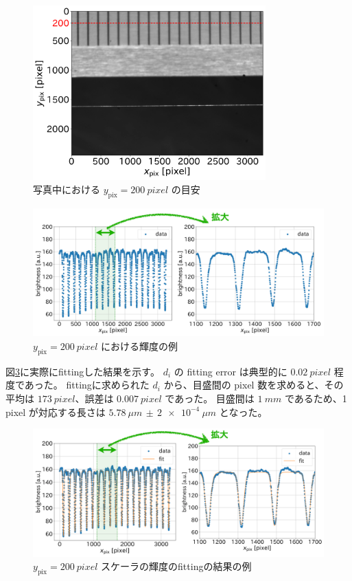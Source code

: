 \documentclass[../../main.tex]{subfiles}
\begin{document}
\begin{figure}[H]
    \centering
    \includegraphics[width=0.8\textwidth]{wiresag/wiresag_scaler_target.pdf}
    \caption{写真中における $y_{\mathrm{pix}}=\SI{200}{pixel}$ の目安}
    \label{fig:wiresag_scaler_target}
\end{figure}
\begin{figure}[H]
    \centering
    \includegraphics[width=1.0\textwidth]{wiresag/wiresag_scaler_brightness.pdf}
    \caption{$y_{\mathrm{pix}}=\SI{200}{pixel}$ における輝度の例}
    \label{fig:wiresag_scaler_brightness}
\end{figure}

図\ref{fig:wiresag_scaler_fitting}に実際にfittingした結果を示す。
$d_i$ の fitting error は典型的に $\SI{0.02}{pixel}$ 程度であった。
fittingに求められた $d_i$ から、目盛間の pixel 数を求めると、その平均は $\SI{173}{pixel}$、誤差は $\SI{0.007}{pixel}$ であった。
目盛間は $\SI{1}{mm}$ であるため、1 pixel が対応する長さは $\SI{5.78}{\mu m}\,\pm\,\SI{2e-4}{\mu m}$ となった。
\begin{figure}[H]
    \centering
    \includegraphics[width=1.0\textwidth]{wiresag/wiresag_scaler_fitting.pdf}
    \caption{$y_{\mathrm{pix}}=\SI{200}{pixel}$ スケーラの輝度のfittingの結果の例}
    \label{fig:wiresag_scaler_fitting}
\end{figure}
\end{document}
